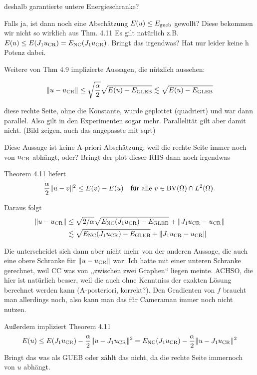       deshalb garantierte untere Energieschranke?

      Falls ja, ist dann noch eine Abschätzung $E(u)\leq E_\textup{gueb}$ gewollt?
      Diese bekommen wir nicht so wirklich aus Thm. 4.11
      Es gilt natürlich z.B.
      $E(u)\leq E(J_1u_\textup{CR})=E_\textup{NC}(J_1u_\textup{CR})$. Bringt das irgendwas? Hat nur
      leider keine h Potenz dabei.

      Weitere von Thm 4.9 implizierte Aussagen, die nützlich aussehen:

      \begin{align*}
        \Vert u-u_\textup{CR}\Vert\leq 
        \sqrt{\frac{\alpha}{2}}\sqrt{E(u)-E_\textup{GLEB}}
        \lesssim
        \sqrt{E(u)-E_\textup{GLEB}}
      \end{align*}

      diese rechte Seite, ohne die Konstante, wurde geplottet (quadriert)
      und war dann parallel. Also gilt in den Experimenten sogar mehr. 
      Parallelität gilt aber damit nicht. (Bild zeigen, auch das angepasste
      mit sqrt)

      Diese Aussage ist keine A-priori Abschätzung, weil die rechte
      Seite immer noch von $u_\textup{CR}$ abhängt, oder?
      Bringt der plot dieser RHS dann noch irgendwas
      

      Theorem 4.11 liefert
  \begin{align*}
    \frac{\alpha}{2}\Vert u-v\Vert^2 \leq E(v)-E(u)\quad
    \text{für alle } v\in\textup{BV}(\Omega)\cap L^2(\Omega).
  \end{align*}

  Daraus folgt
  \begin{align*}
    \Vert u-u_\textup{CR}\Vert &\leq
    \sqrt{2/\alpha}\sqrt{E_\textup{NC}(J_1{u_\textup{CR}})-E_\textup{GLEB}} + \Vert J_1u_\textup{CR}-u_\textup{CR}\Vert\\
    &\lesssim
    \sqrt{E_\textup{NC}(J_1{u_\textup{CR}})-E_\textup{GLEB}} + \Vert J_1u_\textup{CR}-u_\textup{CR}\Vert
  \end{align*}

  Die unterscheidet sich dann aber nicht mehr von der anderen Aussage, die auch 
  eine obere Schranke für $\Vert u-u_\textup{CR}\Vert$ war.
  Ich hatte mit einer unteren Schranke gerechnet, weil CC was von ,,zwischen
  zwei Graphen`` liegen meinte.
  ACHSO, die hier ist natürlich besser, weil die auch ohne Kenntniss der exakten
  Lösung berechnet werden kann (A-posteriori, korrekt?). Den Gradienten von $f$
  braucht man allerdings noch, also kann man das für Cameraman immer noch nicht
  nutzen.

  Außerdem impliziert Theorem 4.11
  \begin{align*}
    E(u)\leq E(J_1 u_\textup{CR})-\frac{\alpha}{2}\Vert u - J_1 u_\textup{CR}\Vert^2 
    = E_\textup{NC}(J_1 u_\textup{CR})-\frac{\alpha}{2}\Vert u - J_1 u_\textup{CR}\Vert^2 
  \end{align*}
  Bringt das was als GUEB oder zählt das nicht, da die rechte Seite immernoch von
  $u$ abhängt.

